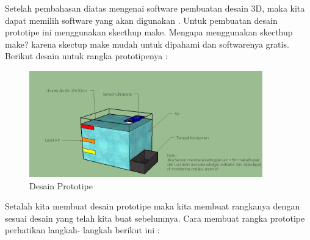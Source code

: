 \par Setelah pembahasan diatas mengenai software pembuatan desain 3D, maka kita dapat memilih software yang akan digunakan . Untuk pembuatan desain prototipe ini menggunakan skecthup make. Mengapa menggunakan skecthup make? karena skectup make mudah untuk dipahami dan softwarenya gratis. Berikut desain untuk rangka prototipenya :
\begin{figure}[H]
\centering
\includegraphics[width=0.9\textwidth]{figures/desain.png}
\caption{Desain Prototipe}
\label{print}
\end{figure}

\par Setalah kita membuat desain prototipe maka kita membuat rangkanya dengan sesuai desain yang telah kita buat sebelumnya. Cara membuat rangka prototipe perhatikan langkah- langkah berikut ini :

